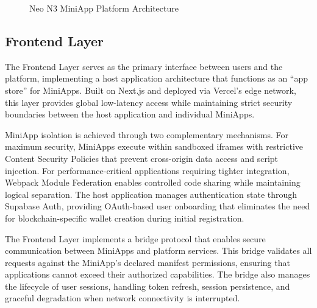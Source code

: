 \documentclass[11pt,a4paper]{article}
\begin{document}
\begin{figure}[h]
\centering
{}
\caption{Neo N3 MiniApp Platform Architecture}
\end{figure}

\subsection{Frontend Layer}

The Frontend Layer serves as the primary interface between users and the platform, implementing a host application architecture that functions as an ``app store'' for MiniApps. Built on Next.js and deployed via Vercel's edge network, this layer provides global low-latency access while maintaining strict security boundaries between the host application and individual MiniApps.

MiniApp isolation is achieved through two complementary mechanisms. For maximum security, MiniApps execute within sandboxed iframes with restrictive Content Security Policies that prevent cross-origin data access and script injection. For performance-critical applications requiring tighter integration, Webpack Module Federation enables controlled code sharing while maintaining logical separation. The host application manages authentication state through Supabase Auth, providing OAuth-based user onboarding that eliminates the need for blockchain-specific wallet creation during initial registration.

The Frontend Layer implements a bridge protocol that enables secure communication between MiniApps and platform services. This bridge validates all requests against the MiniApp's declared manifest permissions, ensuring that applications cannot exceed their authorized capabilities. The bridge also manages the lifecycle of user sessions, handling token refresh, session persistence, and graceful degradation when network connectivity is interrupted.
\end{document}
